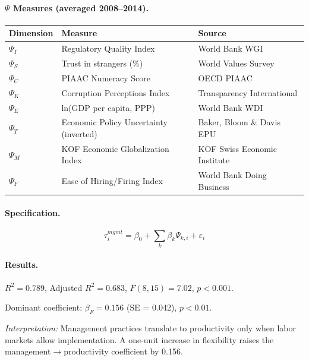 \documentclass[12pt,a4paper]{article}
\begin{document}
\paragraph{$\Psi$ Measures (averaged 2008--2014).}
\begin{center}
\small
\begin{tabular}{@{}lll@{}}
\toprule
\textbf{Dimension} & \textbf{Measure} & \textbf{Source} \\
\midrule
$\Psi_I$ & Regulatory Quality Index & World Bank WGI \\
$\Psi_S$ & Trust in strangers (\%) & World Values Survey \\
$\Psi_C$ & PIAAC Numeracy Score & OECD PIAAC \\
$\Psi_K$ & Corruption Perceptions Index & Transparency International \\
$\Psi_E$ & ln(GDP per capita, PPP) & World Bank WDI \\
$\Psi_T$ & Economic Policy Uncertainty (inverted) & Baker, Bloom \& Davis EPU \\
$\Psi_M$ & KOF Economic Globalization Index & KOF Swiss Economic Institute \\
$\Psi_F$ & Ease of Hiring/Firing Index & World Bank Doing Business \\
\bottomrule
\end{tabular}
\end{center}

\paragraph{Specification.}
\begin{equation}
\tau_i^{mgmt} = \beta_0 + \sum_{k} \beta_k \Psi_{k,i} + \varepsilon_i
\end{equation}

\paragraph{Results.}
$R^2 = 0.789$, Adjusted $R^2 = 0.683$, $F(8,15) = 7.02$, $p < 0.001$.

Dominant coefficient: $\beta_F = 0.156$ (SE = 0.042), $p < 0.01$.

\textit{Interpretation:} Management practices translate to productivity only when labor markets allow implementation. A one-unit increase in flexibility raises the management$\rightarrow$productivity coefficient by 0.156.

\end{document}
